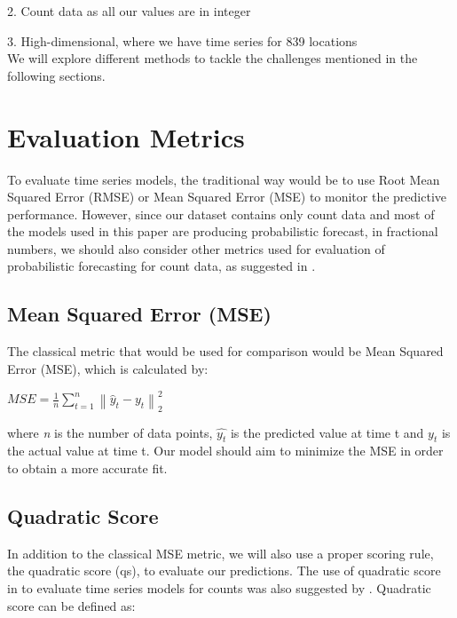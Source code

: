 \documentclass[nonblindrev,msom]{informs3} %
\begin{document}
	2. Count data as all our values are in integer
	
	3. High-dimensional, where we have time series for 839 locations \\
	
\noindent We will explore different methods to tackle the challenges mentioned in the following sections. 


\newpage

\section{Evaluation Metrics}

To evaluate time series models, the traditional way would be to use Root Mean Squared Error (RMSE) or Mean Squared Error (MSE) to monitor the predictive performance. However, since our dataset contains only count data and most of the models used in this paper are producing probabilistic forecast, in fractional numbers, we should also consider other metrics used for evaluation of probabilistic forecasting for count data, as suggested in \cite{Czado2009PredictiveMA}.

\subsection{Mean Squared Error (MSE)}
The classical metric that would be used for comparison would be Mean Squared Error (MSE), which is calculated by:

\begin{center}
    $\displaystyle MSE=\frac{1}{n}\sum_{t=1}^{n}\left \| \hat{y}_{t} - y_{t} \right \|_{2}^{2}$
\end{center}
where \textit{n} is the number of data points, $\hat{y_t}$ is the predicted value at time t and ${y_t}$ is the actual value at time t. Our model should aim to minimize the MSE in order to obtain a more accurate fit. \\

\subsection{Quadratic Score}
\noindent In addition to the classical MSE metric, we will also use a proper scoring rule, the quadratic score (qs), to evaluate our predictions. The use of quadratic score in to evaluate time series models for counts was also suggested by \cite{jstor}. Quadratic score can be defined as:
\end{document}
